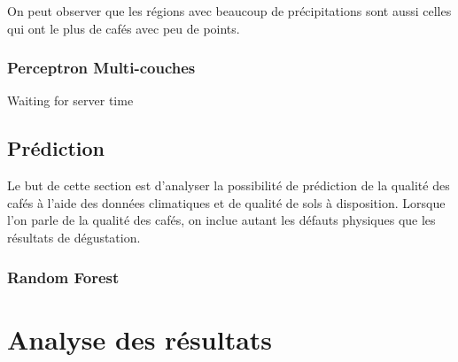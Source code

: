 On peut observer que les régions avec beaucoup de précipitations sont aussi celles qui ont le plus de cafés avec peu de points. 

\newpage
\subsection{Perceptron Multi-couches}
Waiting for server time



\section{Prédiction}
Le but de cette section est d'analyser la possibilité de prédiction de la qualité des cafés à l'aide des données climatiques et de qualité de sols à disposition. Lorsque l'on parle de la qualité des cafés, on inclue autant les défauts physiques que les résultats de dégustation. 



\subsection{Random Forest}



\chapter{Analyse des résultats}



